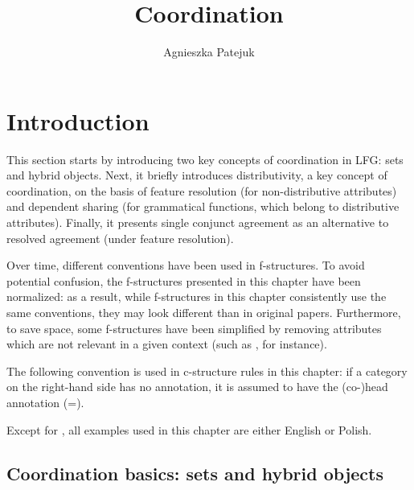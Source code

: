 \documentclass[output=paper]{../langscibook}
\title{Coordination}
\author{Agnieszka Patejuk\affiliation{Polish Academy of Sciences and University of Oxford}}
\begin{document}
\maketitle
\label{chap:Coordination}

\section{Introduction}
\label{sec:Coordination:intro}

This section starts by introducing two key concepts of coordination in LFG:
sets and hybrid objects. Next, it briefly introduces distributivity,
a key concept of coordination, on the basis of feature resolution
(for non-distributive attributes) and dependent sharing (for
grammatical functions, which belong to distributive
attributes). Finally, it presents single conjunct agreement as an
alternative to resolved agreement (under feature resolution).

Over time, different conventions have been used in f-structures. To
avoid potential confusion, the f-structures presented in this chapter
have been normalized: as a result, while f-structures in this chapter
consistently use the same conventions, they may look different than in
original papers. Furthermore, to save space, some f-structures have been
simplified by removing attributes which are not relevant in a given
context (such as \SPEC, for instance).

The following convention is used in c-structure rules in this chapter:
if a category on the right-hand side has no annotation, it is
assumed to have the (co-)head annotation ({\DOWN=\UP}).

Except for , all examples used in this chapter are either English or Polish.

\subsection{Coordination basics: sets and hybrid objects}
\label{sec:Coordination:intro:set}
\end{document}
